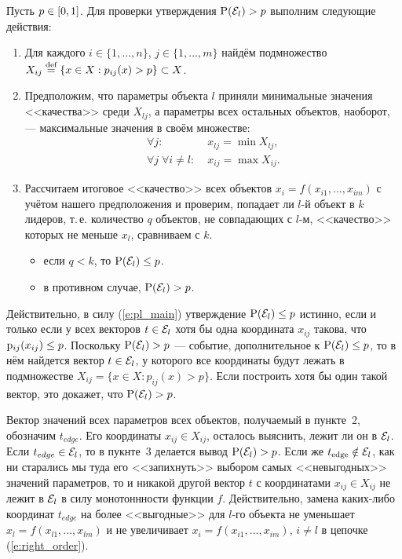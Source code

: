 \documentclass{article}
\begin{document}
Пусть $p \in [0,1]$. Для проверки утверждения ${\mathrm{P}}(\mathcal{E}_l) > p$ выполним следующие действия: 
\begin{enumerate}
  \item 
  Для каждого $i \in \{1, ..., n\}$, $j \in \{1, ..., m\}$ найдём подмножество $X_{ij} \overset{\text{def}}{=} \{x \in X: p_{ij}(x) > p\} \subset X$. 
  \item 
  Предположим, что параметры объекта $l$ приняли минимальные значения <<качества>> среди $X_{lj}$, а параметры всех остальных объектов, наоборот, --- максимальные значения в своём множестве: 
  \begin{align*}
    \forall j:&\;x_{lj} = \min X_{lj}, \\
    \forall j\;\forall i \not= l:&\;x_{ij} = \max X_{ij}.
  \end{align*}
  \item
  Рассчитаем итоговое <<качество>> всех объектов $x_i = f(x_{i1}, ..., x_{im})$ с учётом нашего предположения и проверим, попадает ли $l$-й объект в $k$ лидеров, т.\,е. количество $q$ объектов, не совпадающих с $l$-м, <<качество>> которых не меньше $x_l$, сравниваем с $k$.
 	\begin{itemize}
		\item если $q < k$, то ${\mathrm{P}}(\mathcal{E}_l) \leq p$.
		\item в противном случае, ${\mathrm{P}}(\mathcal{E}_l) > p$.
	\end{itemize} 
\end{enumerate}  

Действительно, в силу (\ref{e:pl_main}) утверждение ${\mathrm{P}}(\mathcal{E}_l) \leq p$ истинно, если и только если у всех векторов $t \in \mathcal{E}_l$ хотя бы одна координата $x_{ij}$ такова, что ${\mathrm{p}}_{ij}(x_{ij}) \leq p$. Поскольку ${\mathrm{P}}(\mathcal{E}_l) > p$ --- событие, дополнительное к ${\mathrm{P}}(\mathcal{E}_l) \leq p$, то в нём найдется вектор $t \in \mathcal{E}_l$, у которого все координаты будут лежать в подмножестве $X_{ij} = \{x \in X: p_{ij}(x) > p\}$. Если построить хотя бы один такой вектор, это докажет, что ${\mathrm{P}}(\mathcal{E}_l) > p$. 

Вектор значений всех параметров всех объектов, получаемый в пункте~2, обозначим $t_{edge}$. Его координаты $x_{ij} \in X_{ij}$, осталось выяснить, лежит ли он в $\mathcal{E}_l$. Если $t_{edge} \in \mathcal{E}_l$, то в пукнте~3 делается вывод ${\mathrm{P}}(\mathcal{E}_l) > p$. Если же $t_\text{edge} \notin \mathcal{E}_l$, как ни старались мы туда его <<запихнуть>> выбором самых <<невыгодных>> значений параметров, то и никакой другой вектор $t$ с координатами $x_{ij} \in X_{ij}$ не лежит в $\mathcal{E}_l$ в силу монотоннности функции $f$. Действительно, замена каких-либо координат $t_{edge}$ на более <<выгодные>> для $l$-го объекта не уменьшает $x_l = f(x_{l1}, ..., x_{lm})$ и не увеличивает $x_i = f(x_{i1}, ..., x_{im})$, $i \neq l$ в цепочке (\ref{e:right_order}).
\end{document}
